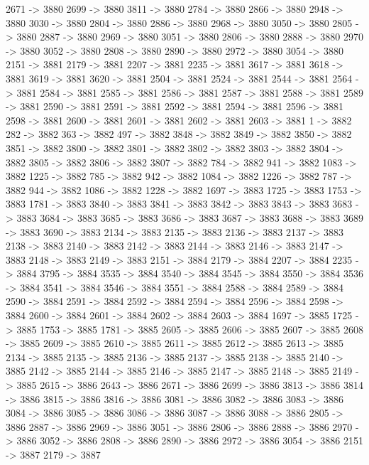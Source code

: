 {	2671 -> 3880
	2699 -> 3880
	3811 -> 3880
	2784 -> 3880
	2866 -> 3880
	2948 -> 3880
	3030 -> 3880
	2804 -> 3880
	2886 -> 3880
	2968 -> 3880
	3050 -> 3880
	2805 -> 3880
	2887 -> 3880
	2969 -> 3880
	3051 -> 3880
	2806 -> 3880
	2888 -> 3880
	2970 -> 3880
	3052 -> 3880
	2808 -> 3880
	2890 -> 3880
	2972 -> 3880
	3054 -> 3880
	2151 -> 3881
	2179 -> 3881
	2207 -> 3881
	2235 -> 3881
	3617 -> 3881
	3618 -> 3881
	3619 -> 3881
	3620 -> 3881
	2504 -> 3881
	2524 -> 3881
	2544 -> 3881
	2564 -> 3881
	2584 -> 3881
	2585 -> 3881
	2586 -> 3881
	2587 -> 3881
	2588 -> 3881
	2589 -> 3881
	2590 -> 3881
	2591 -> 3881
	2592 -> 3881
	2594 -> 3881
	2596 -> 3881
	2598 -> 3881
	2600 -> 3881
	2601 -> 3881
	2602 -> 3881
	2603 -> 3881
	1 -> 3882
	282 -> 3882
	363 -> 3882
	497 -> 3882
	3848 -> 3882
	3849 -> 3882
	3850 -> 3882
	3851 -> 3882
	3800 -> 3882
	3801 -> 3882
	3802 -> 3882
	3803 -> 3882
	3804 -> 3882
	3805 -> 3882
	3806 -> 3882
	3807 -> 3882
	784 -> 3882
	941 -> 3882
	1083 -> 3882
	1225 -> 3882
	785 -> 3882
	942 -> 3882
	1084 -> 3882
	1226 -> 3882
	787 -> 3882
	944 -> 3882
	1086 -> 3882
	1228 -> 3882
	1697 -> 3883
	1725 -> 3883
	1753 -> 3883
	1781 -> 3883
	3840 -> 3883
	3841 -> 3883
	3842 -> 3883
	3843 -> 3883
	3683 -> 3883
	3684 -> 3883
	3685 -> 3883
	3686 -> 3883
	3687 -> 3883
	3688 -> 3883
	3689 -> 3883
	3690 -> 3883
	2134 -> 3883
	2135 -> 3883
	2136 -> 3883
	2137 -> 3883
	2138 -> 3883
	2140 -> 3883
	2142 -> 3883
	2144 -> 3883
	2146 -> 3883
	2147 -> 3883
	2148 -> 3883
	2149 -> 3883
	2151 -> 3884
	2179 -> 3884
	2207 -> 3884
	2235 -> 3884
	3795 -> 3884
	3535 -> 3884
	3540 -> 3884
	3545 -> 3884
	3550 -> 3884
	3536 -> 3884
	3541 -> 3884
	3546 -> 3884
	3551 -> 3884
	2588 -> 3884
	2589 -> 3884
	2590 -> 3884
	2591 -> 3884
	2592 -> 3884
	2594 -> 3884
	2596 -> 3884
	2598 -> 3884
	2600 -> 3884
	2601 -> 3884
	2602 -> 3884
	2603 -> 3884
	1697 -> 3885
	1725 -> 3885
	1753 -> 3885
	1781 -> 3885
	2605 -> 3885
	2606 -> 3885
	2607 -> 3885
	2608 -> 3885
	2609 -> 3885
	2610 -> 3885
	2611 -> 3885
	2612 -> 3885
	2613 -> 3885
	2134 -> 3885
	2135 -> 3885
	2136 -> 3885
	2137 -> 3885
	2138 -> 3885
	2140 -> 3885
	2142 -> 3885
	2144 -> 3885
	2146 -> 3885
	2147 -> 3885
	2148 -> 3885
	2149 -> 3885
	2615 -> 3886
	2643 -> 3886
	2671 -> 3886
	2699 -> 3886
	3813 -> 3886
	3814 -> 3886
	3815 -> 3886
	3816 -> 3886
	3081 -> 3886
	3082 -> 3886
	3083 -> 3886
	3084 -> 3886
	3085 -> 3886
	3086 -> 3886
	3087 -> 3886
	3088 -> 3886
	2805 -> 3886
	2887 -> 3886
	2969 -> 3886
	3051 -> 3886
	2806 -> 3886
	2888 -> 3886
	2970 -> 3886
	3052 -> 3886
	2808 -> 3886
	2890 -> 3886
	2972 -> 3886
	3054 -> 3886
	2151 -> 3887
	2179 -> 3887
}
